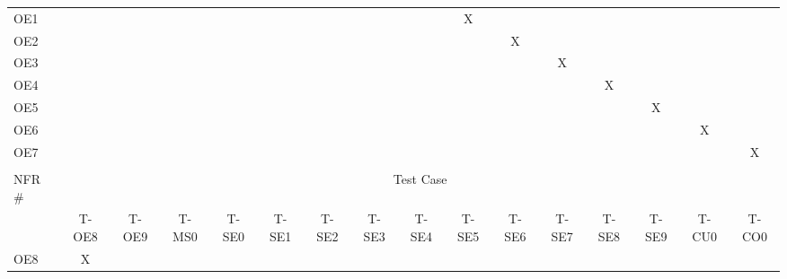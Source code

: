 \documentclass[12pt, titlepage]{article}
\begin{document}
\begin{longtable}{lcccclllllclcccc}
\multicolumn{1}{l|}{OE1} & \multicolumn{1}{l}{} & \multicolumn{1}{l}{} & \multicolumn{1}{l}{} & \multicolumn{1}{l}{} &  &  &  &  & \multicolumn{1}{c}{X} &  & \multicolumn{1}{c}{} &  &  &  &  \\
\multicolumn{1}{l|}{OE2} & \multicolumn{1}{l}{} & \multicolumn{1}{l}{} & \multicolumn{1}{l}{} & \multicolumn{1}{l}{} &  &  &  &  & \multicolumn{1}{c}{} & X & \multicolumn{1}{c}{} &  &  &  &  \\
\multicolumn{1}{l|}{OE3} & \multicolumn{1}{l}{} & \multicolumn{1}{l}{} & \multicolumn{1}{l}{} & \multicolumn{1}{l}{} &  &  &  &  & \multicolumn{1}{c}{} &  & \multicolumn{1}{c}{X} &  &  &  &  \\
\multicolumn{1}{l|}{OE4} & \multicolumn{1}{l}{} & \multicolumn{1}{l}{} & \multicolumn{1}{l}{} & \multicolumn{1}{l}{} &  &  &  &  & \multicolumn{1}{c}{} &  & \multicolumn{1}{c}{} & X &  &  &  \\
\multicolumn{1}{l|}{OE5} & \multicolumn{1}{l}{} & \multicolumn{1}{l}{} & \multicolumn{1}{l}{} & \multicolumn{1}{l}{} &  &  &  &  & \multicolumn{1}{c}{} &  & \multicolumn{1}{c}{} &  & X &  &  \\
\multicolumn{1}{l|}{OE6} & \multicolumn{1}{l}{} & \multicolumn{1}{l}{} & \multicolumn{1}{l}{} & \multicolumn{1}{l}{} &  &  &  &  & \multicolumn{1}{c}{} &  & \multicolumn{1}{c}{} &  &  & X &  \\
\multicolumn{1}{l|}{OE7} & \multicolumn{1}{l}{} & \multicolumn{1}{l}{} & \multicolumn{1}{l}{} & \multicolumn{1}{l}{} &  &  &  &  &  & \multicolumn{1}{l}{} &  & \multicolumn{1}{l}{} & \multicolumn{1}{l}{} &  & X \\
 & \multicolumn{1}{l}{} & \multicolumn{1}{l}{} & \multicolumn{1}{l}{} & \multicolumn{1}{l}{} &  &  &  &  &  & \multicolumn{1}{l}{} &  & \multicolumn{1}{l}{} & \multicolumn{1}{l}{} & \multicolumn{1}{l}{} & \multicolumn{1}{l}{} \\
\multicolumn{1}{l|}{NFR \#} & \multicolumn{15}{c}{Test Case} \\ \hline
\multicolumn{1}{l|}{} & T-OE8 & T-OE9 & T-MS0 & T-SE0 & \multicolumn{1}{c}{T-SE1} & \multicolumn{1}{c}{T-SE2} & \multicolumn{1}{c}{T-SE3} & \multicolumn{1}{c}{T-SE4} & \multicolumn{1}{c}{T-SE5} & T-SE6 & \multicolumn{1}{c}{T-SE7} & T-SE8 & T-SE9 & T-CU0 & T-CO0 \\
\multicolumn{1}{l|}{OE8} & X & \multicolumn{1}{l}{} & \multicolumn{1}{l}{} & \multicolumn{1}{l}{} &  &  &  &  &  & \multicolumn{1}{l}{} &  & \multicolumn{1}{l}{} & \multicolumn{1}{l}{} & \multicolumn{1}{l}{} & \multicolumn{1}{l}{} \\

\end{longtable}
\end{document}
